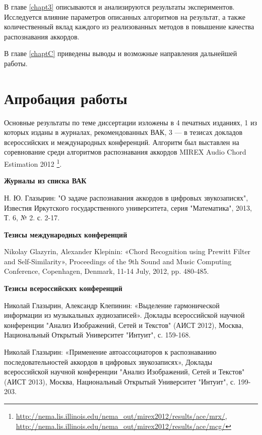 В главе \ref{chapt3} описываются и анализируются результаты экспериментов.
Исследуется влияние параметров описанных алгоритмов на результат, а также
количественный вклад каждого из реализованных методов в повышение качества
распознавания аккордов.

В главе \ref{chaptC} приведены выводы и возможные направления дальнейшей работы.

\section{Апробация работы}

Основные результаты по теме диссертации изложены в 4 печатных изданиях, 1 из
которых изданы в журналах, рекомендованных ВАК, 3 --- в тезисах докладов
всероссийских и международных конференций. Алгоритм был выставлен на
соревнование среди алгоритмов распознавания аккордов MIREX Audio Chord
Estimation 2012
\footnote{\url{http://nema.lis.illinois.edu/nema_out/mirex2012/results/ace/mrx/},
\url{http://nema.lis.illinois.edu/nema_out/mirex2012/results/ace/mcg/}}.

\textbf{Журналы из списка ВАК}

Н. Ю. Глазырин: "О задаче распознавания аккордов в цифровых звукозаписях",
Известия Иркутского государственного университета, серия "Математика", 2013, Т.
6, № 2. с. 2-17.

\textbf{Тезисы международных конференций}

Nikolay Glazyrin, Alexander Klepinin: «Chord Recognition using Prewitt Filter
and Self-Similarity», Proceedings of the 9th Sound and Music Computing
Conference, Copenhagen, Denmark, 11-14 July, 2012, pp. 480-485.

\textbf{Тезисы всероссийских конференций}

Николай Глазырин, Александр Клепинин: «Выделение гармонической информации из
музыкальных аудиозаписей». Доклады всероссийской научной конференции "Анализ
Изображений, Сетей и Текстов" (АИСТ 2012), Москва, Национальный Открытый
Университет "Интуит", с. 159-168.

Николай Глазырин: «Применение автоассоциаторов к распознаванию
последовательностей аккордов в цифровых звукозаписях», Доклады всероссийской
научной конференции "Анализ Изображений, Сетей и Текстов" (АИСТ 2013), Москва,
Национальный Открытый Университет "Интуит", с. 199-203.


% 

